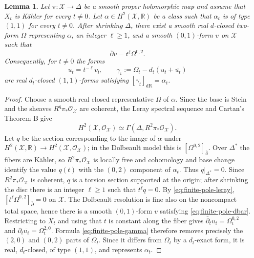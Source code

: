 \documentclass[11pt,letterpaper]{amsart}
\numberwithin{equation}{section}
\newcommand{\RR}{\mathbb{R}}
\newcommand{\cal}{\mathcal}
\def\cX{{\cal X}}
\newtheorem{lemm}[prop]{Lemma}
\begin{document}
\begin{lemm}\label{lem:finite-pole-representative}
Let $\pi:\cX\to\Delta$ be a smooth proper holomorphic map and assume that
$X_t$ is K\"ahler for every $t\ne0$. Let $\alpha\in H^2(\cX,\RR)$ be a class
such that $\alpha_t$ is of type $(1,1)$ for every $t\ne0$. After shrinking
$\Delta$, there exist a smooth real $d$-closed two-form $\Omega$ representing
$\alpha$, an integer $\ell\ge1$, and a smooth $(0,1)$-form $v$ on $\cX$ such
that
\begin{equation}\label{eq:finite-pole-dbar}
 \bar\partial v=t^\ell\Omega^{0,2}.
\end{equation}
Consequently, for $t\ne0$ the forms
\begin{equation}\label{eq:finite-pole-gamma}
 u_t=t^{-\ell}v_t,\qquad
 \gamma_t:=\Omega_t-d_t(u_t+\overline{u_t})
\end{equation}
are real $d_t$-closed $(1,1)$-forms satisfying
$[\gamma_t]_{\mathrm{dR}}=\alpha_t$.
\end{lemm}
\begin{proof}
Choose a smooth real closed representative $\Omega$ of $\alpha$. Since the
base is Stein and the sheaves $R^q\pi_*\mathcal O_{\cX}$ are coherent, the
Leray spectral sequence and Cartan's Theorem B give
\begin{equation}\label{eq:finite-pole-leray}
 H^2(\cX,\mathcal O_{\cX})
 \simeq\Gamma(\Delta,R^2\pi_*\mathcal O_{\cX}).
\end{equation}
Let $q$ be the section corresponding to the image of $\alpha$ under
$H^2(\cX,\RR)\to H^2(\cX,\mathcal O_{\cX})$; in the Dolbeault model this is
$[\Omega^{0,2}]_{\bar\partial}$. Over $\Delta^*$ the fibers are K\"ahler, so
$R^2\pi_*\mathcal O_{\cX}$ is locally free and cohomology and base change
identify the value $q(t)$ with the $(0,2)$ component of $\alpha_t$. Thus
$q|_{\Delta^*}=0$. Since $R^2\pi_*\mathcal O_{\cX}$ is coherent, $q$ is a
torsion section supported at the origin; after shrinking the disc there is an
integer $\ell\ge1$ such that $t^\ell q=0$.
By \eqref{eq:finite-pole-leray},
$[t^\ell\Omega^{0,2}]_{\bar\partial}=0$ on $\cX$. The Dolbeault resolution is
fine also on the noncompact total space, hence there is a smooth $(0,1)$-form
$v$ satisfying \eqref{eq:finite-pole-dbar}. Restricting to $X_t$ and using
that $t$ is constant along the fiber gives
$\bar\partial_tu_t=\Omega_t^{0,2}$ and
$\partial_t\overline{u_t}=\Omega_t^{2,0}$. Formula
\eqref{eq:finite-pole-gamma} therefore removes precisely the $(2,0)$ and
$(0,2)$ parts of $\Omega_t$. Since it differs from $\Omega_t$ by a
$d_t$-exact form, it is real, $d_t$-closed, of type $(1,1)$, and represents
$\alpha_t$.
\end{proof}
\end{document}
